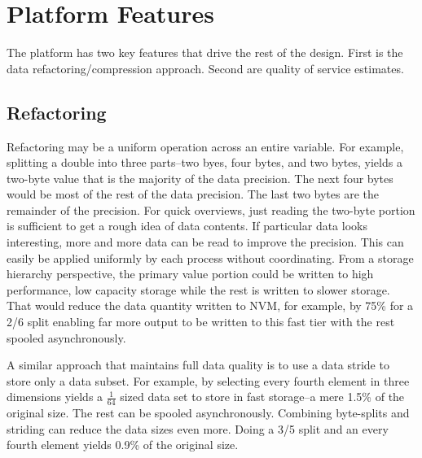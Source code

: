 \documentclass[letterpaper,twocolumn,10pt]{article}
\begin{document}
\section{Platform Features}
\label{sec:features}

The platform has two key features that drive the rest of the design. First is
the data refactoring/compression approach. Second are quality of service
estimates. 

\subsection{Refactoring}
Refactoring may be a uniform operation across an entire variable. For example,
splitting a double into three parts--two byes, four bytes, and two bytes,
yields a two-byte value that is the majority of the data precision. The next
four bytes would be most of the rest of the data precision. The last two bytes
are the remainder of the precision. For quick overviews, just reading the
two-byte portion is sufficient to get a rough idea of data contents. If
particular data looks interesting, more and more data can be read to improve
the precision. This can easily be applied uniformly by each process without
coordinating. From a storage hierarchy perspective, the primary value portion
could be written to high performance, low capacity storage while the rest is
written to slower storage. That would reduce the data quantity written to NVM,
for example, by 75\% for a 2/6 split enabling far more output to be written to
this fast tier with the rest spooled asynchronously.

A similar approach that maintains full data quality is to use a data stride to
store only a data subset. For example, by selecting every fourth element in
three dimensions yields a $\frac{1}{64}$ sized data set to store in fast
storage--a mere 1.5\% of the original size. The rest can be spooled
asynchronously. Combining byte-splits and striding can reduce the data sizes
even more. Doing a 3/5 split and an every fourth element yields 0.9\% of the
original size.
\end{document}
